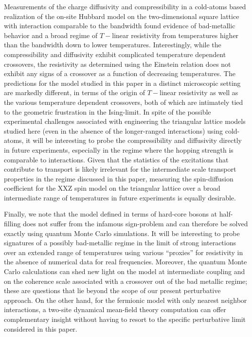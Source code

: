 \documentclass[aps,prx,onecolumn,amsmath,nofootinbib,amssymb,11pt]{revtex4-1}
\begin{document}
{Measurements of the charge diffusivity and compressibility in a cold-atoms based
realization of the on-site Hubbard model on the two-dimensional square lattice with interaction comparable to the bandwidth \cite{Bakr} found evidence of bad-metallic behavior and a broad regime of $T-$linear resistivity from temperatures higher than the bandwidth down to lower temperatures. Interestingly, while the compressibility and diffusivity exhibit complicated temperature dependent crossovers, the resistivity as determined using the Einstein relation does not exhibit any signs of a crossover as a function of decreasing temperatures. The predictions for the model studied in this paper in a distinct microscopic setting are markedly different, in terms of the origin of $T-$linear resistivity as well as the various temperature dependent crossovers, both of which are intimately tied to the geometric frustration in the Ising-limit. In spite of the possible experimental challenges associated with engineering the triangular lattice  models studied here (even in the absence of the longer-ranged interactions) using cold-atoms, it will be interesting to probe the compressibility and diffusivity directly in future experiments, especially in the regime where the hopping strength is comparable to interactions. Given that the statistics of the excitations that contribute to transport is likely irrelevant for the intermediate scale transport properties in the regime discussed in this paper, measuring the spin-diffusion coefficient \cite{Zwierlein} for the XXZ spin model on the triangular lattice over a broad intermediate range of temperatures in future experiments is equally desirable. 

Finally, we note that the model defined in terms of hard-core bosons at half-filling does not suffer from the infamous sign-problem and can therefore be solved exactly using quantum Monte Carlo simulations. It will be interesting to probe signatures of a possibly bad-metallic regime in the limit of strong interactions over an extended range of temperatures using various ``proxies'' for resistivity \cite{Lederer2017} in the absence of numerical data for real frequencies. Moreover, the quantum Monte Carlo calculations can shed new light on the model at intermediate coupling and on the coherence scale associated with a crossover out of the bad metallic regime; these are questions that lie beyond the scope of our present perturbative approach. On the other hand, for the fermionic model with only nearest neighbor interactions, a two-site dynamical mean-field theory \cite{DMFT} computation can offer complementary insight without having to resort to the specific perturbative limit considered in this paper. 

}
\end{document}
